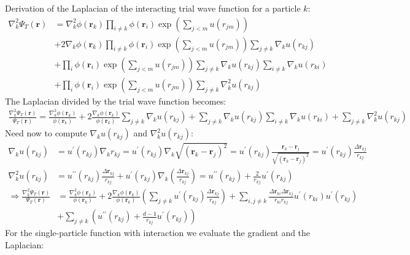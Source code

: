 \documentclass[12pt,a4paper,english]{article}
\begin{document}
Derivation of the Laplacian of the interacting trial wave function for a particle $k$:
\begin{align*}
\nabla_k^2\Psi_T(\textbf{r})&=\nabla_k^2\phi(\textbf{r}_k)\prod_{i\neq k}\phi(\textbf{r}_i)\exp\left(\sum_{j<m}u(r_{jm})\right)\\
&+ 2\nabla_k\phi(\textbf{r}_k)\prod_{i\neq k}\phi(\textbf{r}_i)\exp\left(\sum_{j<m}u(r_{jm})\right)\sum_{j\neq k}\nabla_ku(r_{kj})\\
&+ \prod_{i}\phi(\textbf{r}_i)\exp\left(\sum_{j<m}u(r_{jm})\right)\sum_{j\neq k}\nabla_ku(r_{kj})\sum_{i\neq k}\nabla_ku(r_{ki})\\
&+ \prod_{i}\phi(\textbf{r}_i)\exp\left(\sum_{j<m}u(r_{jm})\right)\sum_{j\neq k}\nabla_k^2u(r_{kj})
\end{align*}
The Laplacian divided by the trial wave function becomes:
\begin{align*}
\frac{\nabla_k^2\Psi_T(\textbf{r})}{\Psi_T(\textbf{r})}=\frac{\nabla_k^2\phi(\textbf{r}_k)}{\phi(\textbf{r}_k)}+2\frac{\nabla_k\phi(\textbf{r}_k)}{\phi(\textbf{r}_k)}\sum_{j\neq k}\nabla_ku(r_{kj})+\sum_{j\neq k}\nabla_ku(r_{kj})\sum_{i\neq k}\nabla_ku(r_{ki})+\sum_{j\neq k}\nabla_k^2u(r_{kj})
\end{align*}
Need now to compute $\nabla_k u(r_{kj})$ and $\nabla_k^2u(r_{kj})$:
\begin{align*}
\nabla_ku(r_{kj})&=u^{\prime}(r_{kj})\nabla_k r_{kj}=u^{\prime}(r_{kj})\nabla_k\sqrt{(\textbf{r}_k-\textbf{r}_j)^2}=u^{\prime}(r_{kj})\frac{\textbf{r}_k-\textbf{r}_j}{\sqrt{(\textbf{r}_k-\textbf{r}_j)^2}}=u^{\prime}(r_{kj})\frac{\Delta\textbf{r}_{kj}}{r_{kj}}\\
\nabla_k^2u(r_{kj})&=u^{\prime\prime}(r_{kj})\frac{\Delta\textbf{r}_{kj}}{r_{kj}}+u^{\prime}(r_{kj})\nabla_k\left(\frac{\Delta\textbf{r}_{kj}}{r_{kj}}\right)
=u^{\prime\prime}(r_{kj})+\frac{2}{r_{kj}}u^{\prime}(r_{kj})
\end{align*}
\begin{align*}
\Rightarrow \frac{\nabla_k^2\Psi_T(\textbf{r})}{\Psi_T(\textbf{r})}&= \frac{\nabla_k^2\phi(\textbf{r}_k)}{\phi(\textbf{r}_k)}+2\frac{\nabla_k\phi(\textbf{r}_k)}{\phi(\textbf{r}_k)}\left(\sum_{j\neq k}u^{\prime}(r_{kj})\frac{\Delta\textbf{r}_{kj}}{r_{kj}}\right)+\sum_{i,j\neq k}\frac{\Delta \textbf{r}_{ki}\Delta \textbf{r}_{kj}}{r_{ki}r_{kj}}u^{\prime}(r_{ki})u^{\prime}(r_{kj})\\
&+\sum_{j\neq k}\left(u^{\prime\prime}(r_{kj})+\frac{d-1}{r_{kj}}u^{\prime}(r_{kj})\right)
\end{align*}
For the single-particle function with interaction we evaluate the gradient and the Laplacian:
\end{document}
